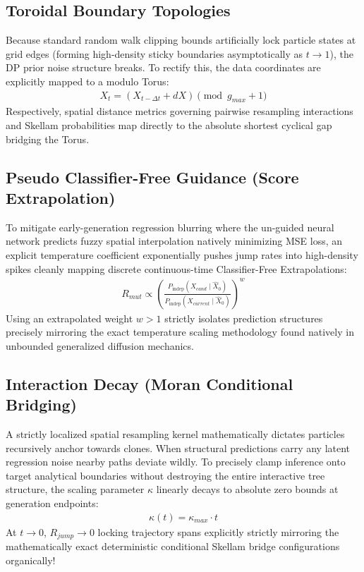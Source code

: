 \documentclass[11pt]{article}
\begin{document}
\subsection{Toroidal Boundary Topologies}
Because standard random walk clipping bounds artificially lock particle states at grid edges (forming high-density sticky boundaries asymptotically as $t \to 1$), the DP prior noise structure breaks. To rectify this, the data coordinates are explicitly mapped to a modulo Torus:
\begin{align}
    X_{t} = (X_{t-\Delta t} + dX) \pmod{g_{max} + 1}
\end{align}
Respectively, spatial distance metrics governing pairwise resampling interactions and Skellam probabilities map directly to the absolute shortest cyclical gap bridging the Torus.

\subsection{Pseudo Classifier-Free Guidance (Score Extrapolation)}
To mitigate early-generation regression blurring where the un-guided neural network predicts fuzzy spatial interpolation natively minimizing MSE loss, an explicit temperature coefficient exponentially pushes jump rates into high-density spikes cleanly mapping discrete continuous-time Classifier-Free Extrapolations:
\begin{align}
    R_{mut} \propto \left(\frac{P_{\text{indep}}(X_{cand} \mid \hat{X}_0)}{P_{\text{indep}}(X_{current} \mid \hat{X}_0)}\right)^w
\end{align}
Using an extrapolated weight $w > 1$ strictly isolates prediction structures precisely mirroring the exact temperature scaling methodology found natively in unbounded generalized diffusion mechanics.

\subsection{Interaction Decay (Moran Conditional Bridging)}
A strictly localized spatial resampling kernel mathematically dictates particles recursively anchor towards clones. When structural predictions carry any latent regression noise nearby paths deviate wildly. To precisely clamp inference onto target analytical boundaries without destroying the entire interactive tree structure, the scaling parameter $\kappa$ linearly decays to absolute zero bounds at generation endpoints:
\begin{align}
    \kappa(t) = \kappa_{max} \cdot t
\end{align}
At $t \to 0$, $R_{jump} \to 0$ locking trajectory spans explicitly strictly mirroring the mathematically exact deterministic conditional Skellam bridge configurations organically!
\end{document}
